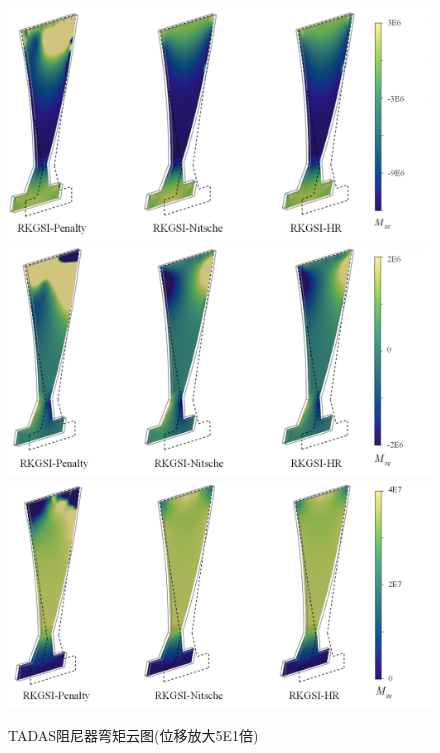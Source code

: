 \begin{figure}[H]
    \centering
        \includegraphics[scale=0.4]{figure/DAMPER/TADAS/M11.png}
        \includegraphics[scale=0.4]{figure/DAMPER/TADAS/M12.png}
        \includegraphics[scale=0.4]{figure/DAMPER/TADAS/M22.png}
    \caption{TADAS阻尼器弯矩云图(位移放大5E1倍)}\label{TADASM}
\end{figure}


